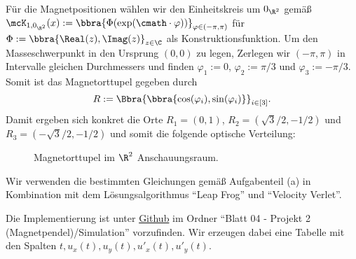 \documentclass[
    oneside,
    ngerman,
    footinclude=false,
    captions=tableheading,
    DIV=12
]{scrartcl}
\begin{document}
\subaufgabe{}
    Für die Magnetpositionen wählen wir den Einheitskreis um $0_{\R^2}$ gemäß $\mcK_{1,0_{\R^2}}(x):=\bbra{\Phi({\exp}(\cmath\cdot\varphi))}_{\varphi\in(-\pi,\pi)}$ für $\Phi:=\bbra{\Real(z),\Imag(z)}_{z\in\C}$ als Konstruktionsfunktion. Um den Masseschwerpunkt in den Ursprung $(0,0)$ zu legen, Zerlegen wir $(-\pi,\pi)$ in Intervalle gleichen Durchmessers und finden $\varphi_1:=0$, $\varphi_2:=\pi/3$ und $\varphi_3:=-\pi/3$. Somit ist das Magnetorttupel gegeben durch
    \[
        R:=\Bbra{\bbra{\cos(\varphi_i),\sin(\varphi_i)}}_{i\in[3]}.
    \]
    Damit ergeben sich konkret die Orte $R_1 = (0,1)$, $R_2 = (\sqrt{3}/2,-1/2)$ und $R_3 = (-\sqrt{3}/2,-1/2)$ und somit die folgende optische Verteilung:
    \begin{figure}[H]
        \centering
        \caption{Magnetorttupel im $\R^2$ Anschauungsraum.}
    \end{figure}


\subaufgabe{}
    Wir verwenden die bestimmten Gleichungen gemäß Aufgabenteil (a) in Kombination mit dem Lösungsalgorithmus \enquote{Leap Frog} und \enquote{Velocity Verlet}. 

\subaufgabe{}
    Die Implementierung ist unter \href{https://github.com/unb3rechenbar/ComputerPhysik-I-Projekte.git}{Github} im Ordner \enquote{Blatt 04 - Projekt 2 (Magnetpendel)/Simulation} vorzufinden. Wir erzeugen dabei eine Tabelle mit den Spalten $t,u_x(t),u_y(t),u'_x(t),u'_y(t)$. 

\subaufgabe{}

\subaufgabe{}
\end{document}
